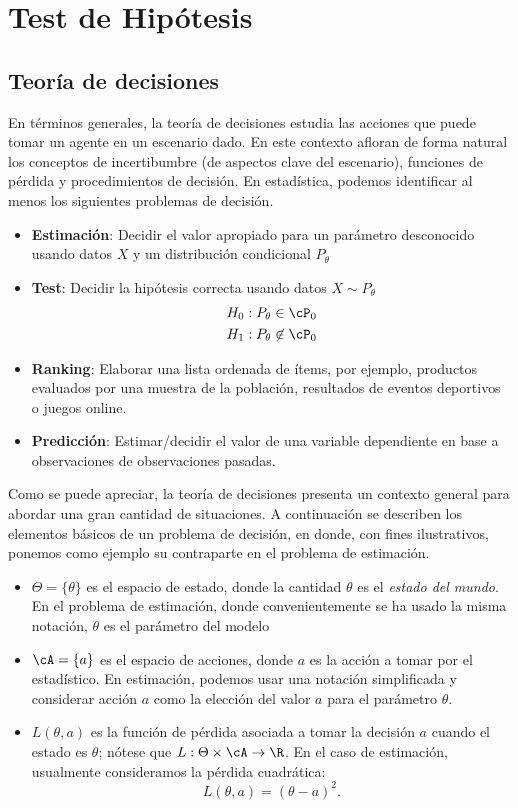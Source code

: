 \chapter{Test de Hipótesis}


\section{Teoría de decisiones}
\label{sec:teoría_de_decisiones}

En términos generales, la teoría de decisiones estudia las acciones que puede tomar un agente en un escenario dado. En este contexto afloran de forma natural los conceptos de incertibumbre (de aspectos clave del escenario), funciones de pérdida y procedimientos de decisión. En estadística, podemos identificar al menos los siguientes problemas de decisión.


\begin{itemize}
	\item \textbf{Estimación}: Decidir el valor apropiado para un parámetro desconocido usando datos $X$ y un distribución condicional $P_\theta$
	\item \textbf{Test}: Decidir la hipótesis correcta usando datos $X\sim P_\theta$
	\begin{align}
		H_0: P_\theta\in\cP_0\\
		H_1: P_\theta\not\in\cP_0
	\end{align}
	\item \textbf{Ranking}: Elaborar una lista ordenada de ítems, por ejemplo, productos evaluados por una muestra de la población, resultados de eventos deportivos o juegos online. 
	\item \textbf{Predicción}: Estimar/decidir el valor de una variable dependiente en base a observaciones de observaciones pasadas. 
\end{itemize}

Como se puede apreciar, la teoría de decisiones presenta un contexto general para abordar una gran cantidad de situaciones. A continuación se describen los elementos básicos de un problema de decisión, en donde, con fines ilustrativos, ponemos como ejemplo su contraparte en el problema de estimación.

\begin{itemize}
	\item $\Theta = \{\theta\}$ es el espacio de estado, donde la cantidad $\theta$ es el \textit{estado del mundo}. En el problema de estimación, donde convenientemente se ha usado la misma notación, $\theta$ es el parámetro del modelo
	\item $\cA=\{a\}$ es el espacio de acciones, donde $a$ es la acción a tomar por el estadístico. En estimación, podemos usar una notación simplificada y considerar acción $a$  como la elección del valor $a$ para el parámetro $\theta$. 
	\item $L(\theta,a)$ es la función de pérdida asociada a tomar la decisión $a$ cuando el estado es $\theta$; nótese que $L:\Theta\times\cA\rightarrow\R$. En el caso de estimación, usualmente consideramos la pérdida cuadrática:
	\begin{equation}
		L(\theta,a) = (\theta-a)^2.
	\end{equation}
\end{itemize}

